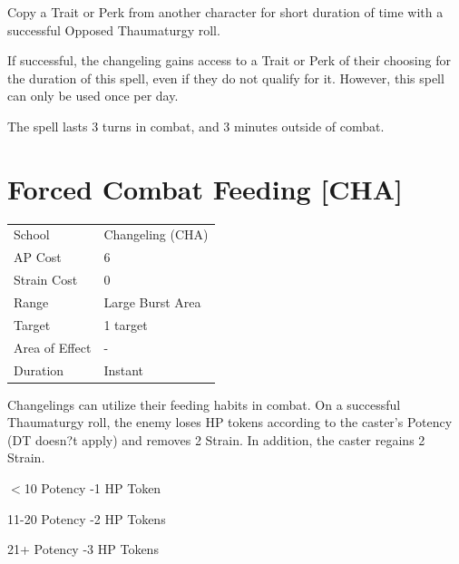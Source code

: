 \documentclass[11pt,a4paper,twocolumn]{book}
\begin{document}
	\medskip
	
	Copy a Trait or Perk from another character for short duration of time with a successful Opposed Thaumaturgy roll.
	
	If successful, the changeling gains access to a Trait or Perk of their choosing for the duration of this spell, even if they do not qualify for it. However, this spell can only be used once per day.
	
	The spell lasts 3 turns in combat, and 3 minutes outside of combat.
	
	\vfill
	
	\pagebreak
	
		\section*{Forced Combat Feeding [CHA]}
	{
		\begin{tabu} to 75mm{| X[l,4] | X[l,7] |}
			\hline
			School 			&  	Changeling (CHA)\\
			AP Cost	      	&  6				\\
			Strain Cost     &  0				\\
			Range     		&  Large Burst Area	\\
			Target      	&  1 target			\\
			Area of Effect  &  -	 			\\
			Duration     	&  Instant			\\ \hline
		\end{tabu}
		
	}
	
	\medskip
	
	Changelings can utilize their feeding habits in combat. On a successful Thaumaturgy roll, the enemy loses HP tokens according to the caster's Potency (DT doesn?t apply) and removes 2 Strain. In addition, the caster regains 2 Strain.
	
	\begin{compactitem}
		\item $<$10 Potency 		-1 HP Token
		\item 11-20 Potency 		-2 HP Tokens
		\item 21+ Potency 		-3 HP Tokens
	\end{compactitem}
	 
\end{document}

